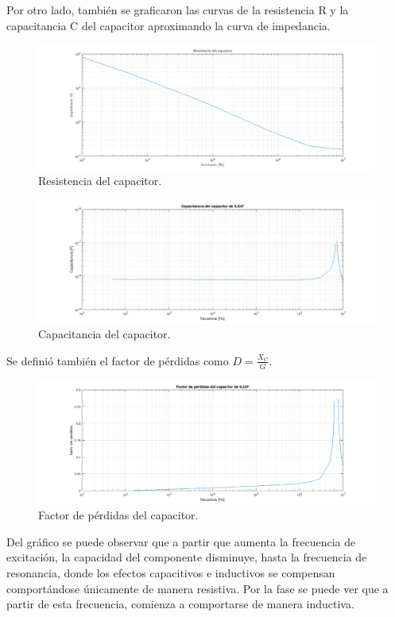Por otro lado, también se graficaron las curvas de la resistencia R y la capacitancia C del capacitor aproximando la curva de impedancia.

\begin{figure}[H]
\centering
\includegraphics[scale=0.5]{resdelC.png}
\caption{Resistencia del capacitor.}
\label{fig:RdelC}
\end{figure}

\begin{figure}[H]
\centering
\includegraphics[scale=0.5]{CdelC.png}
\caption{Capacitancia del capacitor.}
\label{fig:CdelC}
\end{figure}

Se definió también el factor de pérdidas  como $D=\frac{X_C}{G}$.

\begin{figure}[H]
\centering
\includegraphics[scale=0.5]{DdelC.png}
\caption{Factor de pérdidas del capacitor.}
\label{fig:DdelC}
\end{figure}

Del gráfico se puede observar que a partir que aumenta la frecuencia de excitación, la capacidad del componente disminuye, hasta la frecuencia de resonancia, donde los efectos capacitivos  e inductivos se compensan comportándose únicamente de manera resistiva. Por la fase se puede ver que a partir de esta frecuencia, comienza a comportarse de manera inductiva.

